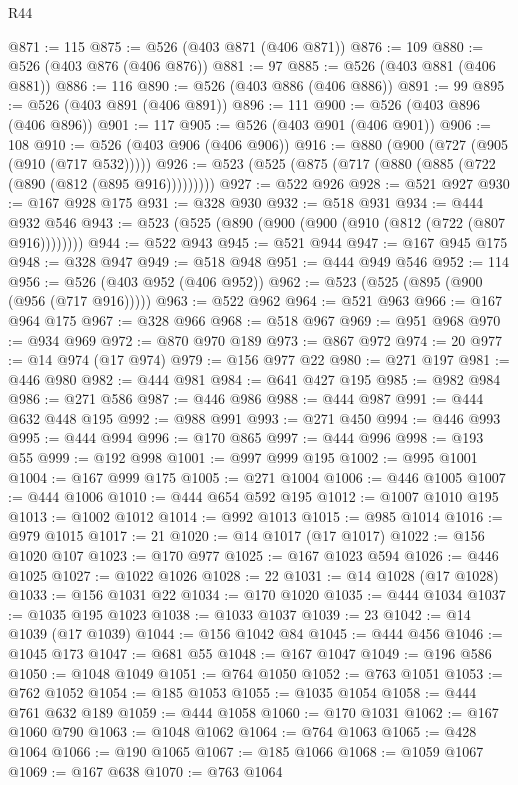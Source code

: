 \begin{lexlean}{R44}
\begin{coremodule}
@871 := 115
@875 := @526 (@403 @871 (@406 @871))
@876 := 109
@880 := @526 (@403 @876 (@406 @876))
@881 := 97
@885 := @526 (@403 @881 (@406 @881))
@886 := 116
@890 := @526 (@403 @886 (@406 @886))
@891 := 99
@895 := @526 (@403 @891 (@406 @891))
@896 := 111
@900 := @526 (@403 @896 (@406 @896))
@901 := 117
@905 := @526 (@403 @901 (@406 @901))
@906 := 108
@910 := @526 (@403 @906 (@406 @906))
@916 := @880 (@900 (@727 (@905 (@910 (@717 @532)))))
@926 := @523 (@525 (@875 (@717 (@880 (@885 (@722 (@890 (@812 (@895 @916)))))))))
@927 := @522 @926
@928 := @521 @927
@930 := @167 @928 @175
@931 := @328 @930
@932 := @518 @931
@934 := @444 @932 @546
@943 := @523 (@525 (@890 (@900 (@900 (@910 (@812 (@722 (@807 @916))))))))
@944 := @522 @943
@945 := @521 @944
@947 := @167 @945 @175
@948 := @328 @947
@949 := @518 @948
@951 := @444 @949 @546
@952 := 114
@956 := @526 (@403 @952 (@406 @952))
@962 := @523 (@525 (@895 (@900 (@956 (@717 @916)))))
@963 := @522 @962
@964 := @521 @963
@966 := @167 @964 @175
@967 := @328 @966
@968 := @518 @967
@969 := @951 @968
@970 := @934 @969
@972 := @870 @970 @189
@973 := @867 @972
@974 := 20
@977 := @14 @974 (@17 @974)
@979 := @156 @977 @22
@980 := @271 @197
@981 := @446 @980
@982 := @444 @981
@984 := @641 @427 @195
@985 := @982 @984
@986 := @271 @586
@987 := @446 @986
@988 := @444 @987
@991 := @444 @632 @448 @195
@992 := @988 @991
@993 := @271 @450
@994 := @446 @993
@995 := @444 @994
@996 := @170 @865
@997 := @444 @996
@998 := @193 @55
@999 := @192 @998
@1001 := @997 @999 @195
@1002 := @995 @1001
@1004 := @167 @999 @175
@1005 := @271 @1004
@1006 := @446 @1005
@1007 := @444 @1006
@1010 := @444 @654 @592 @195
@1012 := @1007 @1010 @195
@1013 := @1002 @1012
@1014 := @992 @1013
@1015 := @985 @1014
@1016 := @979 @1015
@1017 := 21
@1020 := @14 @1017 (@17 @1017)
@1022 := @156 @1020 @107
@1023 := @170 @977
@1025 := @167 @1023 @594
@1026 := @446 @1025
@1027 := @1022 @1026
@1028 := 22
@1031 := @14 @1028 (@17 @1028)
@1033 := @156 @1031 @22
@1034 := @170 @1020
@1035 := @444 @1034
@1037 := @1035 @195 @1023
@1038 := @1033 @1037
@1039 := 23
@1042 := @14 @1039 (@17 @1039)
@1044 := @156 @1042 @84
@1045 := @444 @456
@1046 := @1045 @173
@1047 := @681 @55
@1048 := @167 @1047
@1049 := @196 @586
@1050 := @1048 @1049
@1051 := @764 @1050
@1052 := @763 @1051
@1053 := @762 @1052
@1054 := @185 @1053
@1055 := @1035 @1054
@1058 := @444 @761 @632 @189
@1059 := @444 @1058
@1060 := @170 @1031
@1062 := @167 @1060 @790
@1063 := @1048 @1062
@1064 := @764 @1063
@1065 := @428 @1064
@1066 := @190 @1065
@1067 := @185 @1066
@1068 := @1059 @1067
@1069 := @167 @638
@1070 := @763 @1064

\end{coremodule}
\end{lexlean}
